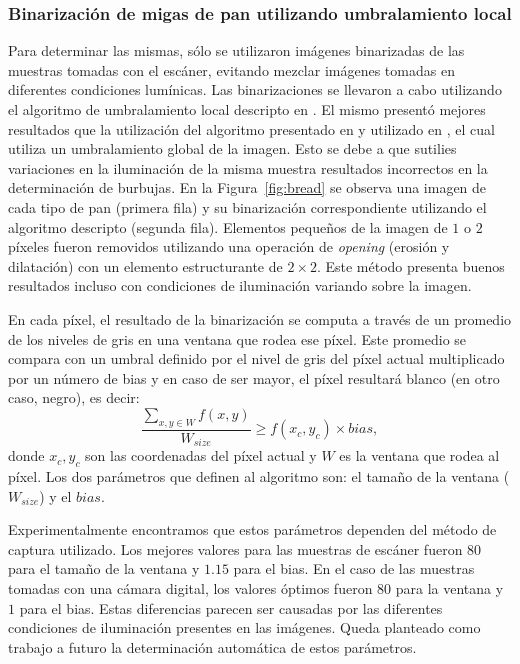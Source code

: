 \documentclass[spanish,a4paper,openright,11pt]{book}
\begin{document}
\subsubsection{Binarización de migas de pan utilizando umbralamiento local}
Para determinar las mismas, sólo se utilizaron imágenes binarizadas de las muestras tomadas con el escáner, evitando mezclar imágenes tomadas en diferentes condiciones lumínicas. Las binarizaciones se llevaron a cabo utilizando el algoritmo de umbralamiento local descripto en \cite{White83}. El mismo presentó mejores resultados que la utilización del algoritmo presentado en \cite{Huang95} y utilizado en \cite{Gonzales2008}, el cual utiliza un umbralamiento global de la imagen. Esto se debe a que sutilies variaciones en la iluminación de la misma muestra resultados incorrectos en la determinación de burbujas. En la Figura~\ref{fig:bread} se observa una imagen de cada tipo de pan (primera fila) y su binarización correspondiente utilizando el algoritmo descripto (segunda fila). Elementos pequeños de la imagen de $1$ o $2$ píxeles fueron removidos utilizando una operación de {\em opening} (erosión y dilatación) con un elemento estructurante de $2\times 2$. Este método presenta buenos resultados incluso con condiciones de iluminación variando sobre la imagen.

En cada píxel, el resultado de la binarización se computa a través de un promedio de los niveles de gris en una ventana que rodea ese píxel. Este promedio se compara con un umbral definido por el nivel de gris del píxel actual multiplicado por un número de bias y en caso de ser mayor, el píxel resultará blanco (en otro caso, negro), es decir:
\begin{equation}
\frac{\sum_{x,y \in W} f(x,y) }{W_{size}} \geq f(x_{c},y_{c}) \times bias,
\label{eqn:white}
\end{equation}
donde $x_{c},y_{c}$ son las coordenadas del píxel actual y  $W$ es la ventana que rodea al píxel. Los dos parámetros que definen al algoritmo son: el tamaño de la ventana ($W_{size}$) y el $bias$. 

Experimentalmente encontramos que estos parámetros dependen del método de captura utilizado. Los mejores valores para las muestras de escáner fueron $80$ para el tamaño de la ventana y $1.15 $ para el bias. En el caso de las muestras tomadas con una cámara digital, los valores óptimos fueron $80$ para la ventana y $1$ para el bias.  Estas diferencias parecen ser causadas por las diferentes condiciones de iluminación presentes en las imágenes. Queda planteado como trabajo a futuro la determinación automática de estos parámetros.
\end{document}

